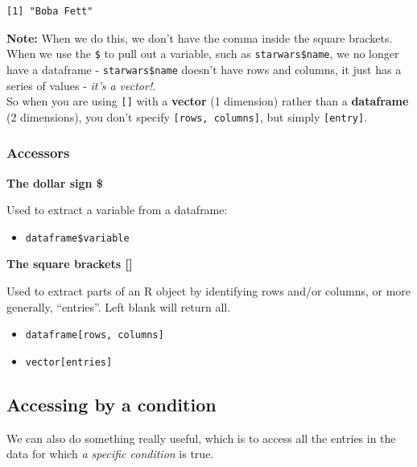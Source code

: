 \documentclass[]{book}
\providecommand{\tightlist}{%
  \setlength{\itemsep}{0pt}\setlength{\parskip}{0pt}}
\begin{document}
\begin{verbatim}
[1] "Boba Fett"
\end{verbatim}

\textbf{Note:} When we do this, we don't have the comma inside the square brackets.\\
When we use the \texttt{\$} to pull out a variable, such as \texttt{starwars\$name}, we no longer have a dataframe - \texttt{starwars\$name} doesn't have rows and columns, it just has a series of values - \emph{it's a vector!}.\\
So when you are using \texttt{{[}{]}} with a \textbf{vector} (1 dimension) rather than a \textbf{dataframe} (2 dimensions), you don't specify \texttt{{[}rows,\ columns{]}}, but simply \texttt{{[}entry{]}}.

\hypertarget{accessors}{%
\subsubsection*{Accessors}\label{accessors}}

\textbf{The dollar sign \$}

Used to extract a variable from a dataframe:

\begin{itemize}
\tightlist
\item
  \texttt{dataframe\$variable}
\end{itemize}

\textbf{The square brackets {[}{]}}

Used to extract parts of an R object by identifying rows and/or columns, or more generally, ``entries''. Left blank will return all.

\begin{itemize}
\tightlist
\item
  \texttt{dataframe{[}rows,\ columns{]}}~\\
\item
  \texttt{vector{[}entries{]}}
\end{itemize}

\hypertarget{accessing-by-a-condition}{%
\subsection*{Accessing by a condition}\label{accessing-by-a-condition}}

We can also do something really useful, which is to access all the entries in the data for which \emph{a specific condition} is true.
\end{document}
